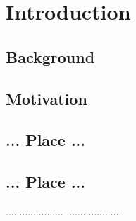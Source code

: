 \chapter{Introduction}
\ifpdf
    \graphicspath{{Introduction/IntroductionFigs/PNG/}{Introduction/IntroductionFigs/PDF/}{Introduction/IntroductionFigs/}}
\else
    \graphicspath{{Introduction/IntroductionFigs/EPS/}{Introduction/IntroductionFigs/}}
\fi

\section{Background}

\section{Motivation}

\section{... Place ...}

\section{... Place ...}
.....................
.....................



